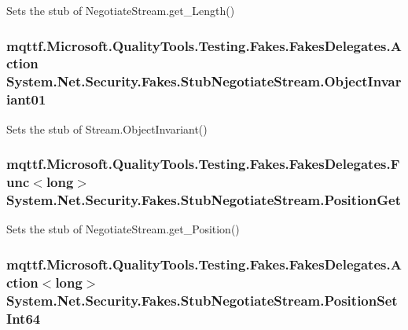 Sets the stub of Negotiate\-Stream.\-get\-\_\-\-Length()

\hypertarget{class_system_1_1_net_1_1_security_1_1_fakes_1_1_stub_negotiate_stream_a987d678ab55b4945bf27d7d583ab6486}{
\subsubsection[{Object\-Invariant01}]{\setlength{\rightskip}{0pt plus 5cm}mqttf.\-Microsoft.\-Quality\-Tools.\-Testing.\-Fakes.\-Fakes\-Delegates.\-Action System.\-Net.\-Security.\-Fakes.\-Stub\-Negotiate\-Stream.\-Object\-Invariant01}}\label{class_system_1_1_net_1_1_security_1_1_fakes_1_1_stub_negotiate_stream_a987d678ab55b4945bf27d7d583ab6486}


Sets the stub of Stream.\-Object\-Invariant()

\hypertarget{class_system_1_1_net_1_1_security_1_1_fakes_1_1_stub_negotiate_stream_a66515add28041c4871c4cb5b632c3e7d}{
\subsubsection[{Position\-Get}]{\setlength{\rightskip}{0pt plus 5cm}mqttf.\-Microsoft.\-Quality\-Tools.\-Testing.\-Fakes.\-Fakes\-Delegates.\-Func$<$long$>$ System.\-Net.\-Security.\-Fakes.\-Stub\-Negotiate\-Stream.\-Position\-Get}}\label{class_system_1_1_net_1_1_security_1_1_fakes_1_1_stub_negotiate_stream_a66515add28041c4871c4cb5b632c3e7d}


Sets the stub of Negotiate\-Stream.\-get\-\_\-\-Position()

\hypertarget{class_system_1_1_net_1_1_security_1_1_fakes_1_1_stub_negotiate_stream_a396c03ee3a858c2bb1ea7659b7c8d63a}{
\subsubsection[{Position\-Set\-Int64}]{\setlength{\rightskip}{0pt plus 5cm}mqttf.\-Microsoft.\-Quality\-Tools.\-Testing.\-Fakes.\-Fakes\-Delegates.\-Action$<$long$>$ System.\-Net.\-Security.\-Fakes.\-Stub\-Negotiate\-Stream.\-Position\-Set\-Int64}}\label{class_system_1_1_net_1_1_security_1_1_fakes_1_1_stub_negotiate_stream_a396c03ee3a858c2bb1ea7659b7c8d63a}


